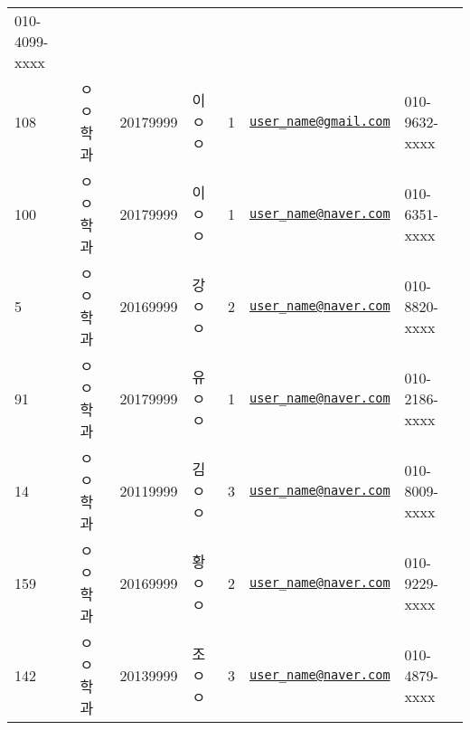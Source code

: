 \documentclass[]{article}
\begin{document}
\begin{longtable}[]{@{}lllllll@{}}
010-4099-xxxx\tabularnewline
108 & ㅇㅇ학과 & 20179999 & 이ㅇㅇ & 1 &
\href{mailto:user_name@gmail.com}{\nolinkurl{user\_name@gmail.com}} &
010-9632-xxxx\tabularnewline
100 & ㅇㅇ학과 & 20179999 & 이ㅇㅇ & 1 &
\href{mailto:user_name@naver.com}{\nolinkurl{user\_name@naver.com}} &
010-6351-xxxx\tabularnewline
5 & ㅇㅇ학과 & 20169999 & 강ㅇㅇ & 2 &
\href{mailto:user_name@naver.com}{\nolinkurl{user\_name@naver.com}} &
010-8820-xxxx\tabularnewline
91 & ㅇㅇ학과 & 20179999 & 유ㅇㅇ & 1 &
\href{mailto:user_name@naver.com}{\nolinkurl{user\_name@naver.com}} &
010-2186-xxxx\tabularnewline
14 & ㅇㅇ학과 & 20119999 & 김ㅇㅇ & 3 &
\href{mailto:user_name@naver.com}{\nolinkurl{user\_name@naver.com}} &
010-8009-xxxx\tabularnewline
159 & ㅇㅇ학과 & 20169999 & 황ㅇㅇ & 2 &
\href{mailto:user_name@naver.com}{\nolinkurl{user\_name@naver.com}} &
010-9229-xxxx\tabularnewline
142 & ㅇㅇ학과 & 20139999 & 조ㅇㅇ & 3 &
\href{mailto:user_name@naver.com}{\nolinkurl{user\_name@naver.com}} &
010-4879-xxxx\tabularnewline
\bottomrule
\end{longtable}
\end{document}
